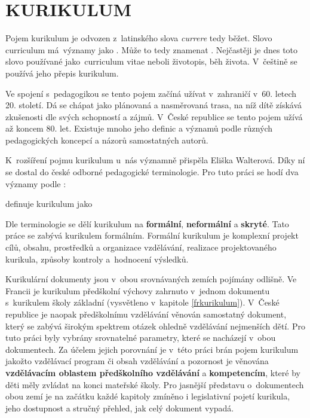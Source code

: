 \chapter{KURIKULUM}
\label{kurikulum}
Pojem kurikulum je odvozen z latinského slova \textit{currere} tedy běžet.  Slovo curriculum má významy jako \textit{}. Může to tedy znamenat \textit{} \citep[s.~24]{Opravilova}. Nejčastěji je dnes toto slovo používané jako curriculum vitae neboli životopis, běh života. V češtině se používá jeho přepis kurikulum.

Ve spojení s pedagogikou se tento pojem začíná užívat v zahraničí v 60. letech 20. století. Dá se chápat jako plánovaná a nasměrovaná trasa, na níž dítě získává zkušenosti dle svých schopností a zájmů. V České republice se tento pojem užívá až koncem 80. let. Existuje mnoho jeho definic a významů podle různých pedagogických koncepcí a názorů samostatných autorů.

K rozšíření pojmu kurikulum u~nás významně přispěla Eliška Walterová. Díky ní se dostal do české odborné pedagogické terminologie. Pro tuto práci se hodí dva významy podle \citet[s.~15]{Walterova}:


\citet[s.~237]{Prucha} definuje kurikulum jako 

Dle terminologie se dělí kurikulum na \textbf{formální}, \textbf{neformální} a \textbf{skryté}. Tato práce se zabývá kurikulem formálním. Formální kurikulum je komplexní projekt cílů, obsahu, prostředků a organizace vzdělávání, realizace projektovaného kurikula, způsoby kontroly a hodnocení výsledků.

Kurikulární dokumenty jsou v~obou srovnávaných zemích pojímány odlišně. Ve Francii je kurikulum předškolní výchovy zahrnuto v~jednom dokumentu s~kurikulem školy základní (vysvětleno v~kapitole \ref{frkurikulum}). V~České republice je naopak předškolnímu vzdělávání věnován samostatný dokument, který se zabývá širokým spektrem otázek ohledně vzdělávání nejmenších dětí. Pro tuto práci byly vybrány srovnatelné parametry, které se nacházejí v obou dokumentech. Za účelem jejich porovnání je v této práci brán pojem kurikulum jakožto vzdělávací program či obsah vzdělávání a pozornost je věnována \textbf{vzdělávacím oblastem předškolního vzdělávání} a \textbf{kompetencím}, které by děti měly zvládat na konci mateřské školy. Pro jasnější představu o~dokumentech obou zemí je na začátku každé kapitoly zmíněno i legislativní pojetí kurikula, jeho dostupnost a stručný přehled, jak celý dokument vypadá. 

